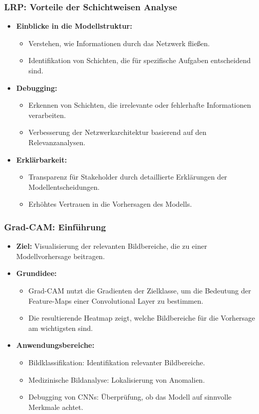 \documentclass[aspectratio=1610, xcolor=dvipsnames, 9pt]{beamer}
\begin{document}
\begin{frame}
  \frametitle{LRP: Vorteile der Schichtweisen Analyse}
  \begin{itemize}
    \item \textbf{Einblicke in die Modellstruktur:}
    \begin{itemize}
      \item Verstehen, wie Informationen durch das Netzwerk fließen.
      \item Identifikation von Schichten, die für spezifische Aufgaben entscheidend sind.
    \end{itemize}
    \item \textbf{Debugging:}
    \begin{itemize}
      \item Erkennen von Schichten, die irrelevante oder fehlerhafte Informationen verarbeiten.
      \item Verbesserung der Netzwerkarchitektur basierend auf den Relevanzanalysen.
    \end{itemize}
    \item \textbf{Erklärbarkeit:}
    \begin{itemize}
      \item Transparenz für Stakeholder durch detaillierte Erklärungen der Modellentscheidungen.
      \item Erhöhtes Vertrauen in die Vorhersagen des Modells.
    \end{itemize}
  \end{itemize}
\end{frame}

\begin{frame}
  \frametitle{Grad-CAM: Einführung}
  \begin{itemize}
    \item \textbf{Ziel:} Visualisierung der relevanten Bildbereiche, die zu einer Modellvorhersage beitragen.
    \item \textbf{Grundidee:}
    \begin{itemize}
      \item Grad-CAM nutzt die Gradienten der Zielklasse, um die Bedeutung der Feature-Maps einer Convolutional Layer zu bestimmen.
      \item Die resultierende Heatmap zeigt, welche Bildbereiche für die Vorhersage am wichtigsten sind.
    \end{itemize}
    \item \textbf{Anwendungsbereiche:}
    \begin{itemize}
      \item Bildklassifikation: Identifikation relevanter Bildbereiche.
      \item Medizinische Bildanalyse: Lokalisierung von Anomalien.
      \item Debugging von CNNs: Überprüfung, ob das Modell auf sinnvolle Merkmale achtet.
    \end{itemize}
  \end{itemize}
\end{frame}
\end{document}
